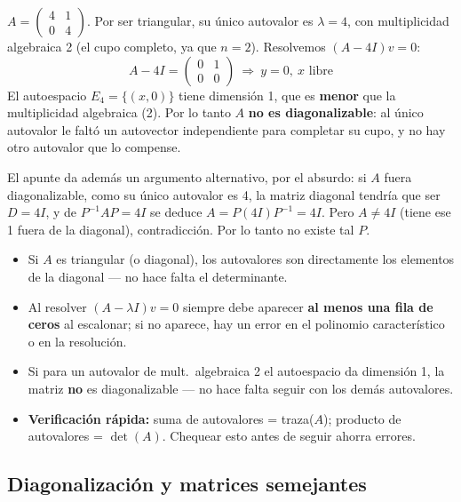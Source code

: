 \documentclass[11pt,a4paper]{article}
\begin{document}
\begin{ejemplo}
$A=\begin{pmatrix}4&1\\0&4\end{pmatrix}$. Por ser triangular, su único autovalor es
$\lambda=4$, con multiplicidad algebraica 2 (el cupo completo, ya que $n=2$). Resolvemos
$(A-4I)v=0$:
\[
A-4I=\begin{pmatrix}0&1\\0&0\end{pmatrix}\ \Rightarrow\ y=0,\ x \text{ libre}
\]
El autoespacio $E_4=\{(x,0)\}$ tiene dimensión 1, que es \textbf{menor} que la
multiplicidad algebraica (2). Por lo tanto $A$ \textbf{no es diagonalizable}: al único
autovalor le faltó un autovector independiente para completar su cupo, y no hay otro
autovalor que lo compense.

El apunte da además un argumento alternativo, por el absurdo: si $A$ fuera
diagonalizable, como su único autovalor es 4, la matriz diagonal tendría que ser
$D=4I$, y de $P^{-1}AP=4I$ se deduce $A=P(4I)P^{-1}=4I$. Pero $A\neq4I$ (tiene ese 1 fuera
de la diagonal), contradicción. Por lo tanto no existe tal $P$.
\end{ejemplo}

\begin{atencion}
\begin{itemize}
    \item Si $A$ es triangular (o diagonal), los autovalores son directamente los
    elementos de la diagonal — no hace falta el determinante.
    \item Al resolver $(A-\lambda I)v=0$ siempre debe aparecer \textbf{al menos una fila de
    ceros} al escalonar; si no aparece, hay un error en el polinomio característico o en
    la resolución.
    \item Si para un autovalor de mult.\ algebraica 2 el autoespacio da dimensión 1, la
    matriz \textbf{no} es diagonalizable — no hace falta seguir con los demás autovalores.
    \item \textbf{Verificación rápida:} suma de autovalores = traza($A$); producto de
    autovalores = $\det(A)$. Chequear esto antes de seguir ahorra errores.
\end{itemize}
\end{atencion}

\subsection{Diagonalización y matrices semejantes}
\end{document}
